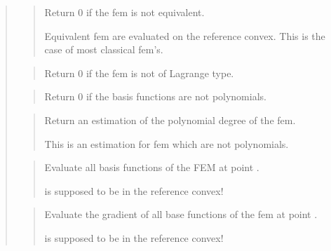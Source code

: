 \documentclass[a4paper,11pt,english]{sphinxmanual}
\begin{document}
\begin{quote}
\begin{quote}

Return 0 if the fem is not equivalent.

Equivalent fem are evaluated on the reference convex. This is
the case of most classical fem’s.
\end{quote}

\begin{quote}

Return 0 if the fem is not of Lagrange type.
\end{quote}

\begin{quote}

Return 0 if the basis functions are not polynomials.
\end{quote}

\begin{quote}

Return an estimation of the polynomial degree of the fem.

This is an estimation for fem which are not polynomials.
\end{quote}

\begin{quote}

Evaluate all basis functions of the FEM at point .

 is supposed to be in the reference convex!
\end{quote}

\begin{quote}

Evaluate the gradient of all base functions of the fem at point .

 is supposed to be in the reference convex!
\end{quote}

\begin{quote}


\end{quote}
\end{quote}
\end{document}
